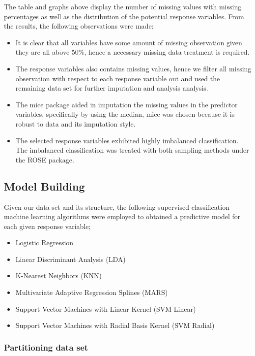 \documentclass[
  10pt,
]{article}
\begin{document}
The table and graphs above display the number of missing values with missing percentages as well as the distribution of the potential response variables. From the results, the following observations were made:

\begin{itemize}
\item
  It is clear that all variables have some amount of missing observation given they are all above 50\%, hence a necessary missing data treatment is required.
\item
  The response variables also contains missing values, hence we filter all missing observation with respect to each response variable out and used the remaining data set for further imputation and analysis analysis.
\item
  The mice package aided in imputation the missing values in the predictor variables, specifically by using the median, mice was chosen because it is robust to data and its imputation style.
\item
  The selected response variables exhibited highly imbalanced classification. The imbalanced classification was treated with both sampling methods under the ROSE package.
\end{itemize}

\hypertarget{model-building}{%
\subsection{Model Building}\label{model-building}}

Given our data set and its structure, the following supervised classification machine learning algorithms were employed to obtained a predictive model for each given response variable;

\begin{itemize}
\item
  Logistic Regression
\item
  Linear Discriminant Analysis (LDA)
\item
  K-Nearest Neighbors (KNN)
\item
  Multivariate Adaptive Regression Splines (MARS)
\item
  Support Vector Machines with Linear Kernel (SVM Linear)
\item
  Support Vector Machines with Radial Basis Kernel (SVM Radial)
\end{itemize}

\hypertarget{partitioning-data-set}{%
\subsubsection{Partitioning data set}\label{partitioning-data-set}}
\end{document}
